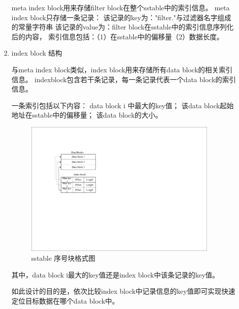 \begin{enumerate}
\begin{enumerate}
	meta index block用来存储filter block在整个sstable中的索引信息。
meta index block只存储一条记录：
该记录的key为："filter."与过滤器名字组成的常量字符串
该记录的value为：filter block在sstable中的索引信息序列化后的内容，
索引信息包括：（1）在sstable中的偏移量（2）数据长度。

	\item index block 结构
	
	与meta index block类似，index block用来存储所有data block的相关索引信息。
indexblock包含若干条记录，每一条记录代表一个data block的索引信息。

一条索引包括以下内容：
data block i 中最大的key值；
该data block起始地址在sstable中的偏移量；
该data block的大小。

\begin{figure}[H]
	\centering
	\includegraphics[width=0.95\textwidth]{pdf/indexblock_format.pdf}
	\caption{sstable 序号块格式图}
	\label{sstable_indexblock_format}
\end{figure}

其中，data block i最大的key值还是index block中该条记录的key值。

如此设计的目的是，依次比较index block中记录信息的key值即可实现快速定位目标数据在哪个data block中。


\end{enumerate}
\end{enumerate}
